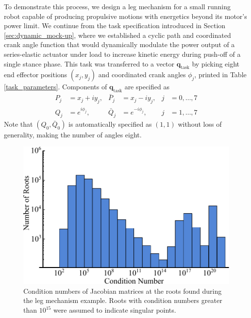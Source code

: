 \documentclass[journal]{IEEEtran}
\def\*#1{\bar{#1}} %
\begin{document}
To demonstrate this process, we design a leg mechanism for a small running robot capable of producing propulsive motions with energetics beyond its motor's power limit.
We continue from the task specification introduced in Section \ref{sec:dynamic_mock-up}, where we established a cyclic path and coordinated crank angle function that would dynamically modulate the power output of a series-elastic actuator under load to increase kinetic energy during push-off of a single stance phase.
This task was transferred to a vector $\mathbf{q}_\text{task}$ by picking eight end effector positions $(x_j,y_j)$ and coordinated crank angles $\phi_j$, printed in Table \ref{task_parameters}.  Components of $\mathbf{q}_\text{task}$ are specified as
\begin{align}
P_j &= x_j + iy_j, & \*P_j &= x_j - iy_j, & j&=0,\ldots,7 \nonumber\\
Q_j &= e^{i\phi_j}, & \*Q_j &= e^{-i\phi_j}, & j&=1,\ldots,7 
\end{align}
Note that $(Q_0,\*Q_0)$ is automatically specified as $(1,1)$ without loss of generality, making the number of angles eight.



\begin{figure}[!t]
\centering
\includegraphics[scale=0.5]{root_histogram}
\caption{Condition numbers of Jacobian matrices at the roots found during the leg mechanism example.  Roots with condition numbers greater than $10^{15}$ were assumed to indicate singular points.}
\label{root_histogram}
\end{figure}
\end{document}
